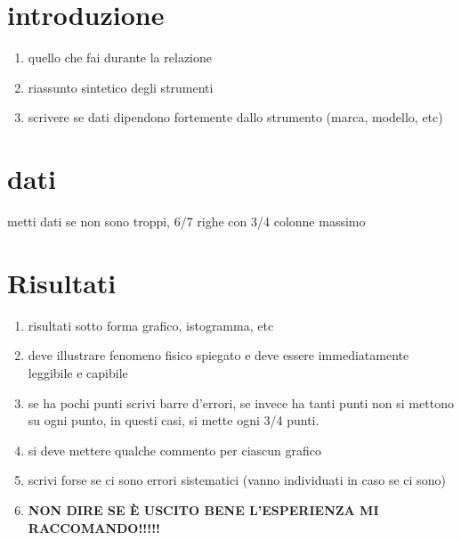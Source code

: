 \documentclass[a4paper]{article}
\begin{document}
\section{introduzione}
\begin{enumerate}
   \item quello che fai durante la relazione
   \item riassunto sintetico degli strumenti
   \item scrivere se dati dipendono fortemente dallo strumento (marca, modello, etc)
\end{enumerate}

\section{dati}
metti dati se non sono troppi, 6/7 righe con 3/4 colonne massimo

\section{Risultati}
\begin{enumerate}
   \item risultati sotto forma grafico, istogramma, etc
   \item deve illustrare fenomeno fisico spiegato e deve essere immediatamente leggibile e capibile
   \item se ha pochi punti scrivi barre d'errori, se invece ha tanti punti non si mettono su ogni punto, in questi casi, si mette ogni 3/4 punti. 
   \item si deve mettere qualche commento per ciascun grafico
   \item scrivi forse se ci sono errori sistematici (vanno individuati in caso se ci sono)
   \item \textbf{NON DIRE SE È USCITO BENE L'ESPERIENZA MI RACCOMANDO!!!!!}
\end{enumerate}
\end{document}
